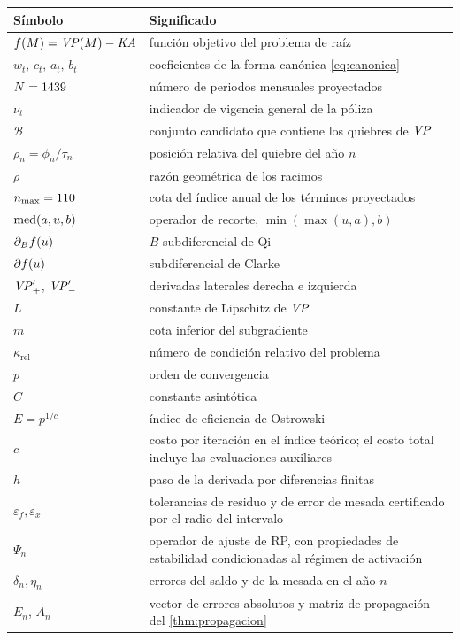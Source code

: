 \begin{longtable}{@{}p{}p{}@{}}
\toprule
\textbf{Símbolo} & \textbf{Significado} \\
\midrule
\endhead
$f(M)=\mathit{VP}(M)-\mathit{KA}$ & función objetivo del problema de raíz \\
$w_t,\,c_t,\,a_t,\,b_t$ & coeficientes de la forma canónica \cref{eq:canonica} \\
$N=1439$ & número de periodos mensuales proyectados \\
$\nu_t$ & indicador de vigencia general de la póliza \\
$\mathcal{B}$ & conjunto candidato que contiene los quiebres de $\mathit{VP}$ \\
$\rho_n=\phi_n/\tau_n$ & posición relativa del quiebre del año $n$ \\
$\rho$ & razón geométrica de los racimos \\
$n_{\max}=110$ & cota del índice anual de los términos proyectados \\
$\operatorname{med}(a,u,b)$ & operador de recorte, $\min(\max(u,a),b)$ \\
$\partial_B f(u)$ & $B$-subdiferencial de Qi \\
$\partial f(u)$ & subdiferencial de Clarke \\
$\mathit{VP}'_+$, $\mathit{VP}'_-$ & derivadas laterales derecha e izquierda \\
$L$ & constante de Lipschitz de $\mathit{VP}$ \\
$m$ & cota inferior del subgradiente \\
$\kappa_{\mathrm{rel}}$ & número de condición relativo del problema \\
$p$ & orden de convergencia \\
$C$ & constante asintótica \\
$E=p^{1/c}$ & índice de eficiencia de Ostrowski \\
$c$ & costo por iteración en el índice teórico; el costo total incluye las evaluaciones auxiliares \\
$h$ & paso de la derivada por diferencias finitas \\
$\varepsilon_f,\varepsilon_x$ & tolerancias de residuo y de error de mesada certificado por el radio del intervalo \\
$\Psi_n$ & operador de ajuste de RP, con propiedades de estabilidad condicionadas al régimen de activación \\
$\delta_n,\eta_n$ & errores del saldo y de la mesada en el año $n$ \\
$E_n$, $A_n$ & vector de errores absolutos y matriz de propagación del \cref{thm:propagacion} \\
\bottomrule
\end{longtable}

